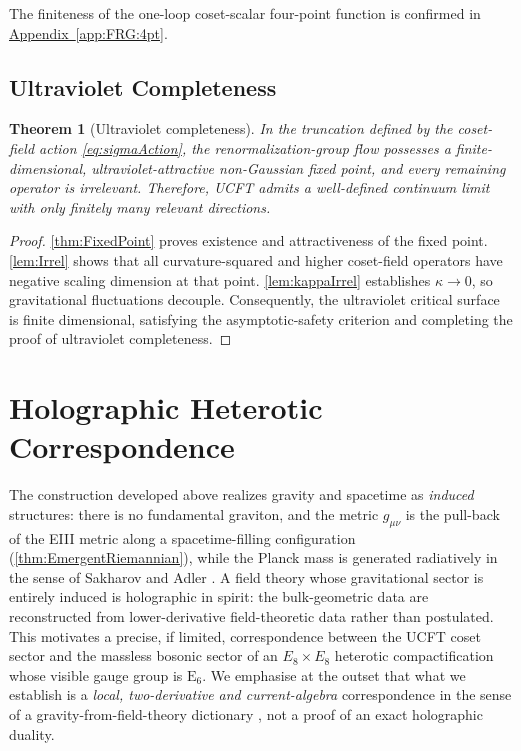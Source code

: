 \documentclass[pdflatex,sn-mathphys-num]{sn-jnl}
\theoremstyle{thmstyleone}
\newtheorem{theorem}{Theorem}
\theoremstyle{thmstyletwo}%
\theoremstyle{thmstylethree}%
\newcommand{\E}[1]{\mathrm{E_{#1}}}
\newcommand{\ESix}{\E{6}}
\newcommand{\appref}[1]{\hyperref[#1]{Appendix~\ref*{#1}}}
\begin{document}
The finiteness of the one-loop coset-scalar four-point function is confirmed in \appref{app:FRG:4pt}.

\subsection{Ultraviolet Completeness}
\label{subsec:UVComplete}

\begin{theorem}[Ultraviolet completeness]\label{thm:UVcomplete}
In the truncation defined by the coset-field action \eqref{eq:sigmaAction}, the renormalization-group flow possesses a finite-dimensional, ultraviolet-attractive non-Gaussian fixed point, and every remaining operator is irrelevant. Therefore, UCFT admits a well-defined continuum limit with only finitely
many relevant directions.
\end{theorem}

\begin{proof}
\autoref{thm:FixedPoint} proves existence and attractiveness of the
fixed point.
\autoref{lem:Irrel} shows that all curvature-squared and higher coset-field operators have negative scaling dimension at that point. \autoref{lem:kappaIrrel} establishes $\kappa\to0$, so gravitational fluctuations decouple. Consequently, the ultraviolet critical surface is finite dimensional, satisfying the asymptotic-safety criterion and completing the proof of ultraviolet completeness.
\end{proof}


\section{Holographic Heterotic Correspondence}
\label{sec:Holographic}

The construction developed above realizes gravity and spacetime as
\emph{induced} structures: there is no fundamental graviton, and the metric
$g_{\mu\nu}$ is the pull-back of the EIII metric along a spacetime-filling
configuration (\autoref{thm:EmergentRiemannian}), while the Planck mass is
generated radiatively in the sense of Sakharov and Adler
\cite{SakharovInducedGravity,AdlerInducedGravity}.  A field theory whose
gravitational sector is entirely induced is holographic in spirit: the
bulk-geometric data are reconstructed from lower-derivative field-theoretic
data rather than postulated.  This motivates a precise, if limited,
correspondence between the UCFT coset sector and the massless bosonic sector of
an $E_{8}\times E_{8}$ heterotic compactification \cite{GHMR:1985} whose visible
gauge group is $\ESix$.  We emphasise at the outset that what we establish is a
\emph{local, two-derivative and current-algebra} correspondence in the sense of
a gravity-from-field-theory dictionary \cite{Maldacena:1997}, not a proof of an
exact holographic duality.
\end{document}
